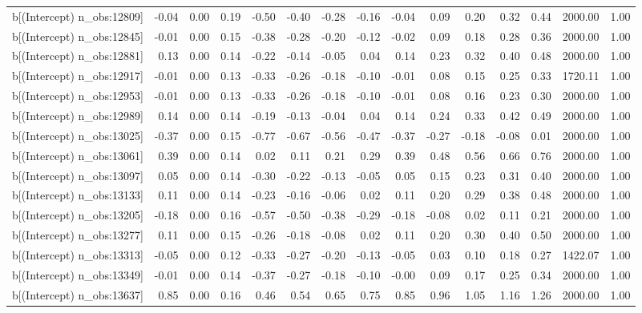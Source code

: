 \begin{table}[ht]
\begin{tabular}{rrrrrrrrrrrrrrr}
  b[(Intercept) n\_obs:12809] & -0.04 & 0.00 & 0.19 & -0.50 & -0.40 & -0.28 & -0.16 & -0.04 & 0.09 & 0.20 & 0.32 & 0.44 & 2000.00 & 1.00 \\ 
  b[(Intercept) n\_obs:12845] & -0.01 & 0.00 & 0.15 & -0.38 & -0.28 & -0.20 & -0.12 & -0.02 & 0.09 & 0.18 & 0.28 & 0.36 & 2000.00 & 1.00 \\ 
  b[(Intercept) n\_obs:12881] & 0.13 & 0.00 & 0.14 & -0.22 & -0.14 & -0.05 & 0.04 & 0.14 & 0.23 & 0.32 & 0.40 & 0.48 & 2000.00 & 1.00 \\ 
  b[(Intercept) n\_obs:12917] & -0.01 & 0.00 & 0.13 & -0.33 & -0.26 & -0.18 & -0.10 & -0.01 & 0.08 & 0.15 & 0.25 & 0.33 & 1720.11 & 1.00 \\ 
  b[(Intercept) n\_obs:12953] & -0.01 & 0.00 & 0.13 & -0.33 & -0.26 & -0.18 & -0.10 & -0.01 & 0.08 & 0.16 & 0.23 & 0.30 & 2000.00 & 1.00 \\ 
  b[(Intercept) n\_obs:12989] & 0.14 & 0.00 & 0.14 & -0.19 & -0.13 & -0.04 & 0.04 & 0.14 & 0.24 & 0.33 & 0.42 & 0.49 & 2000.00 & 1.00 \\ 
  b[(Intercept) n\_obs:13025] & -0.37 & 0.00 & 0.15 & -0.77 & -0.67 & -0.56 & -0.47 & -0.37 & -0.27 & -0.18 & -0.08 & 0.01 & 2000.00 & 1.00 \\ 
  b[(Intercept) n\_obs:13061] & 0.39 & 0.00 & 0.14 & 0.02 & 0.11 & 0.21 & 0.29 & 0.39 & 0.48 & 0.56 & 0.66 & 0.76 & 2000.00 & 1.00 \\ 
  b[(Intercept) n\_obs:13097] & 0.05 & 0.00 & 0.14 & -0.30 & -0.22 & -0.13 & -0.05 & 0.05 & 0.15 & 0.23 & 0.31 & 0.40 & 2000.00 & 1.00 \\ 
  b[(Intercept) n\_obs:13133] & 0.11 & 0.00 & 0.14 & -0.23 & -0.16 & -0.06 & 0.02 & 0.11 & 0.20 & 0.29 & 0.38 & 0.48 & 2000.00 & 1.00 \\ 
  b[(Intercept) n\_obs:13205] & -0.18 & 0.00 & 0.16 & -0.57 & -0.50 & -0.38 & -0.29 & -0.18 & -0.08 & 0.02 & 0.11 & 0.21 & 2000.00 & 1.00 \\ 
  b[(Intercept) n\_obs:13277] & 0.11 & 0.00 & 0.15 & -0.26 & -0.18 & -0.08 & 0.02 & 0.11 & 0.20 & 0.30 & 0.40 & 0.50 & 2000.00 & 1.00 \\ 
  b[(Intercept) n\_obs:13313] & -0.05 & 0.00 & 0.12 & -0.33 & -0.27 & -0.20 & -0.13 & -0.05 & 0.03 & 0.10 & 0.18 & 0.27 & 1422.07 & 1.00 \\ 
  b[(Intercept) n\_obs:13349] & -0.01 & 0.00 & 0.14 & -0.37 & -0.27 & -0.18 & -0.10 & -0.00 & 0.09 & 0.17 & 0.25 & 0.34 & 2000.00 & 1.00 \\ 
  b[(Intercept) n\_obs:13637] & 0.85 & 0.00 & 0.16 & 0.46 & 0.54 & 0.65 & 0.75 & 0.85 & 0.96 & 1.05 & 1.16 & 1.26 & 2000.00 & 1.00 \\ 

\end{tabular}
\end{table}
